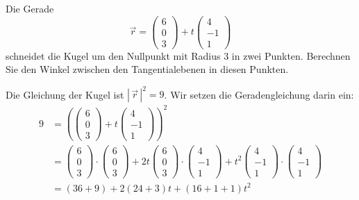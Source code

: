 Die Gerade
\[
\vec r
=
\begin{pmatrix}6\\0\\3\end{pmatrix}
+t
\begin{pmatrix}4\\-1\\1\end{pmatrix}
\]
schneidet die Kugel um den Nullpunkt mit Radius $3$ in zwei Punkten.
Berechnen Sie den Winkel zwischen den Tangentialebenen in diesen
Punkten.


\begin{loesung}
Die Gleichung der Kugel ist $|\,\vec r\,|^2=9$. Wir setzen die Geradengleichung
darin ein:
\begin{align*}
9&=\left(
\begin{pmatrix}6\\0\\3\end{pmatrix}+t\begin{pmatrix}4\\-1\\1\end{pmatrix}
\right)^2
\\
&=
\begin{pmatrix}6\\0\\3\end{pmatrix}
\cdot
\begin{pmatrix}6\\0\\3\end{pmatrix}
+2t
\begin{pmatrix}6\\0\\3\end{pmatrix}
\cdot
\begin{pmatrix}4\\-1\\1\end{pmatrix}
+t^2
\begin{pmatrix}4\\-1\\1\end{pmatrix}
\cdot
\begin{pmatrix}4\\-1\\1\end{pmatrix}
\\
&=(36+9)+2(24+3)t+(16+1+1)t^2\\

\end{align*}
\end{loesung}

